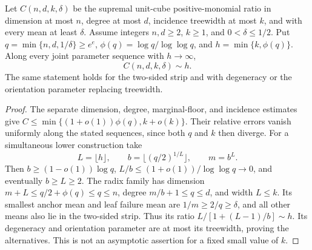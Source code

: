 \begin{theorem}\label{thm:joint-growth}
Let $C(n,d,k,\delta)$ be the supremal unit-cube positive-monomial ratio
in dimension at most $n$, degree at most $d$, incidence treewidth at most
$k$, and with every mean at least $\delta$. Assume integers $n,d\ge2$,
$k\ge1$, and $0<\delta\le1/2$. Put
$q=\min\{n,d,1/\delta\}\ge e^e$,
$\phi(q)=\log q/\log\log q$, and $h=\min\{k,\phi(q)\}$.
Along every joint parameter sequence with $h\to\infty$,
\[
 C(n,d,k,\delta)\sim h.
\]
The same statement holds for the two-sided strip and with degeneracy or
the orientation parameter replacing treewidth.
\end{theorem}
\begin{proof}
The separate dimension, degree, marginal-floor, and incidence estimates
give $C\le\min\{(1+o(1))\phi(q),k+o(k)\}$. Their relative errors vanish
uniformly along the stated sequences, since both $q$ and $k$ then diverge.
For a simultaneous lower construction take
\[
 L=\lfloor h\rfloor,\qquad b=\lfloor(q/2)^{1/L}\rfloor,\qquad m=b^L.
\]
Then $b\ge(1-o(1))\log q$, $L/b\le(1+o(1))/\log\log q\to0$,
and eventually $b\ge L\ge2$. The radix family has dimension
$m+L\le q/2+\phi(q)\le q\le n$, degree $m/b+1\le q\le d$, and
width $L\le k$. Its smallest anchor mean and leaf failure mean are
$1/m\ge2/q\ge\delta$, and all other means also lie in the two-sided
strip. Thus its ratio $L/[1+(L-1)/b]\sim h$. Its degeneracy and
orientation parameter are at most its treewidth, proving the alternatives.
This is not an asymptotic assertion for a fixed small value of $k$.
\end{proof}
